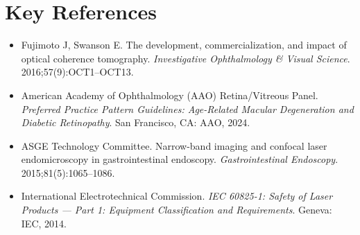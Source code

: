 \section{Key References}
\begin{itemize}
  \item Fujimoto J, Swanson E. The development, commercialization, and impact of optical coherence tomography. \emph{Investigative Ophthalmology \& Visual Science}. 2016;57(9):OCT1--OCT13.
  \item American Academy of Ophthalmology (AAO) Retina/Vitreous Panel. \emph{Preferred Practice Pattern Guidelines: Age-Related Macular Degeneration and Diabetic Retinopathy}. San Francisco, CA: AAO, 2024.
  \item ASGE Technology Committee. Narrow-band imaging and confocal laser endomicroscopy in gastrointestinal endoscopy. \emph{Gastrointestinal Endoscopy}. 2015;81(5):1065--1086.
  \item International Electrotechnical Commission. \emph{IEC 60825-1: Safety of Laser Products --- Part 1: Equipment Classification and Requirements}. Geneva: IEC, 2014.
\end{itemize}
